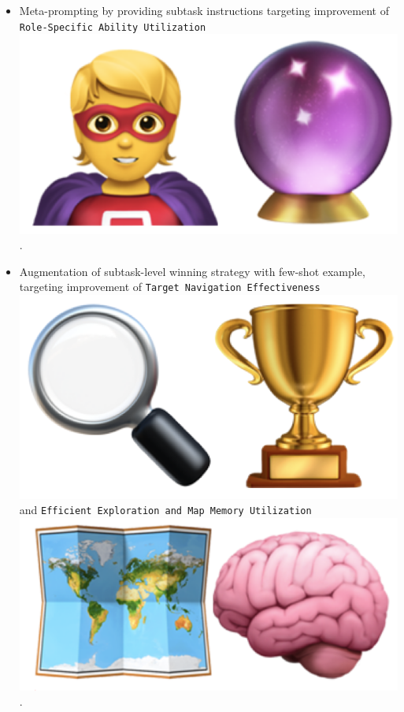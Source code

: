 \begin{flushleft}
\begin{itemize}
		\item Meta-prompting by providing subtask instructions targeting improvement
			of \texttt{Role-Specific Ability Utilization}
			\includegraphics[scale=0.05]{figs/emojis/mini_6.png}
			.

		\item Augmentation of subtask-level winning strategy with few-shot example,
			targeting improvement of \texttt{Target Navigation Effectiveness}
			\includegraphics[scale=0.05]{figs/emojis/mini_1.png}
			and \texttt{Efficient Exploration and Map Memory Utilization}
			\includegraphics[scale=0.05]{figs/emojis/mini_2.png}
			.
	\end{itemize}


\end{flushleft}
